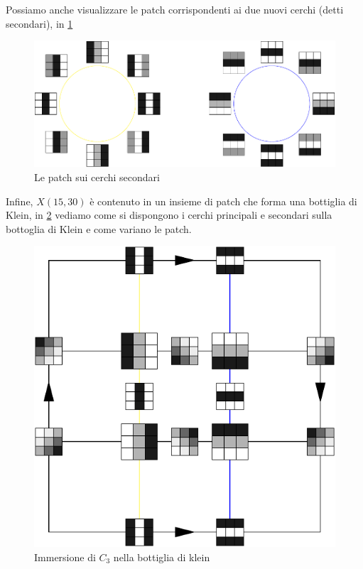 Possiamo anche visualizzare le patch corrispondenti ai due nuovi cerchi (detti secondari), in \cref{fig:secondarycircle}

\begin{figure}[ht]
  \begin{center}
    \includegraphics[width=.8\linewidth]{gfx/secondarycircles.pdf}
    \caption{Le patch sui cerchi secondari}
    \label{fig:secondarycircle}
  \end{center}
\end{figure}

Infine, $X(15,30)$ è contenuto in un insieme di patch che forma una bottiglia di Klein, in \cref{fig:kleinpatch} vediamo come si dispongono i cerchi principali e secondari sulla bottoglia di Klein e come variano le patch.

\begin{figure}[ht]
  \begin{center}
    \includegraphics[width=.6\linewidth]{gfx/kleinpatches.pdf}
    \caption{Immersione di $C_3$ nella bottiglia di klein}
    \label{fig:kleinpatch}
  \end{center}
\end{figure}
